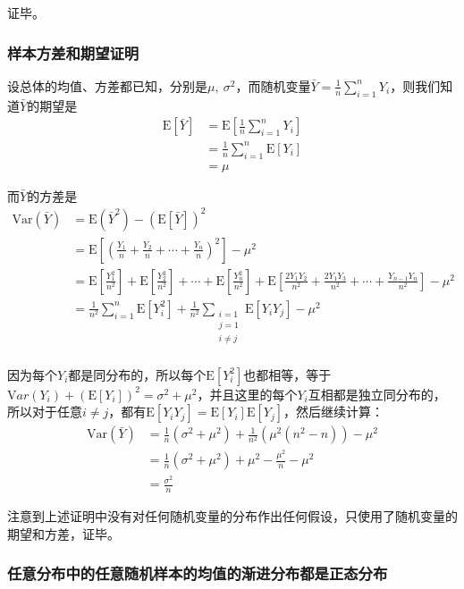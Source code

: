 \documentclass[UTF8]{ctexbook}
\begin{document}
证毕。

\subsubsection{样本方差和期望证明}
\label{proof8}
设总体的均值、方差都已知，分别是$\mu,\ \sigma^2$，而随机变量$\bar Y=\frac{1}{n}\sum_{i=1}^nY_i$，则我们知道$\bar Y$的期望是
\begin{align*}
	\mathrm E[\bar Y]&=\mathrm E[\frac{1}{n}\sum_{i=1}^nY_i]\\
	&=\frac{1}{n}\sum_{i=1}^n\mathrm E[Y_i]\\
	&=\mu
\end{align*}

而$\bar Y$的方差是
\begin{align*}
	\mathrm {Var}(\bar Y)&=\mathrm E(\bar Y^2)-(\mathrm E[\bar Y])^2\\
	&=\mathrm E[(\frac{Y_1}{n}+\frac{Y_2}{n}+\cdots+\frac{Y_n}{n})^2]-\mu^2\\
	&=\mathrm E[\frac{Y_1^2}{n^2}]+\mathrm E[\frac{Y_2^2}{n^2}]+\cdots+\mathrm E[\frac{Y_n^2}{n^2}]+\mathrm E[\frac{2Y_1Y_2}{n^2}+\frac{2Y_1Y_3}{n^2}+\cdots+\frac{Y_{n-1}Y_n}{n^2}]-\mu^2\\
	&=\frac{1}{n^2}\sum_{i=1}^n\mathrm E[Y_i^2]+\frac{1}{n^2}\sum_{\substack{i=1\\j=1\\i\neq j}}\mathrm E[Y_iY_j]-\mu^2\\
\end{align*}

因为每个$Y_i$都是同分布的，所以每个$\mathrm E[Y_i^2]$也都相等，等于$\mathrm Var(Y_i)+(\mathrm E[Y_i])^2=\sigma^2+\mu^2$，并且这里的每个$Y_i$互相都是独立同分布的，所以对于任意$i\neq j$，都有$\mathrm E[Y_iY_j]=\mathrm E[Y_i]\mathrm E[Y_j]$，然后继续计算：
\begin{align*}
	\mathrm {Var}(\bar Y)&=\frac{1}{n}(\sigma^2+\mu^2)+\frac{1}{n^2}(\mu^2(n^2-n))-\mu^2\\
	&=\frac{1}{n}(\sigma^2+\mu^2)+\mu^2-\frac{\mu^2}{n}-\mu^2\\
	&=\frac{\sigma^2}{n}
\end{align*}

注意到上述证明中没有对任何随机变量的分布作出任何假设，只使用了随机变量的期望和方差，证毕。

\subsubsection{任意分布中的任意随机样本的均值的渐进分布都是正态分布}
\label{any-dist-avg-aspt-normal}
\end{document}
